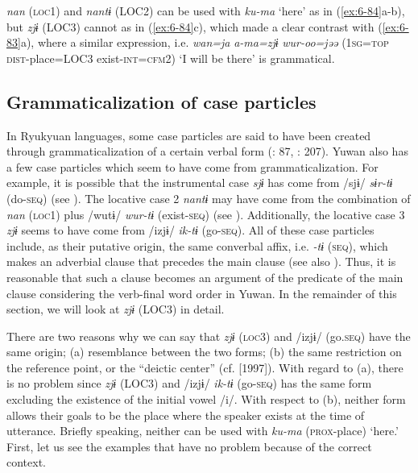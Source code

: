 \begin{table}
      [El: 130817]

\textit{nan} (\textsc{loc}1) and \textit{nantɨ} (LOC2) can be used with \textit{ku-ma} ‘here’ as in (\ref{ex:6-84}a-b), but \textit{zjɨ} (LOC3) cannot as in (\ref{ex:6-84}c), which made a clear contrast with (\ref{ex:6-83}a), where a similar expression, i.e. \textit{wan=ja} \textit{a-ma=zjɨ} \textit{wur-oo=jəə} (1\textsc{sg}=\textsc{top} \textsc{dist}-place=LOC3 exist-\textsc{int}=\textsc{cfm}2) ‘I will be there’ is grammatical.

\subsection{Grammaticalization of case particles}

In Ryukyuan languages, some case particles are said to have been created through grammaticalization of a certain verbal form (\citealt{NishiokaNakahara2000}: 87, \citealt{Shimoji2008}: 207). Yuwan also has a few case particles which seem to have come from grammaticalization. For example, it is possible that the instrumental case \textit{sjɨ} has come from /sjɨ/ \textit{sɨr-tɨ} (do-\textsc{seq}) (see ). The locative case 2 \textit{nantɨ} may have come from the combination of \textit{nan} (\textsc{loc}1) plus /wutɨ/ \textit{wur-tɨ} (exist-\textsc{seq}) (see ). Additionally, the locative case 3 \textit{zjɨ} seems to have come from /izjɨ/ \textit{ik-tɨ} (go-\textsc{seq}). All of these case particles include, as their putative origin, the same converbal affix, i.e. \textit{-tɨ} (\textsc{seq}), which makes an adverbial clause that precedes the main clause (see also ). Thus, it is reasonable that such a clause becomes an argument of the predicate of the main clause considering the verb-final word order in Yuwan. In the remainder of this section, we will look at \textit{zjɨ} (LOC3) in detail.

There are two reasons why we can say that \textit{zjɨ} (\textsc{loc}3) and /izjɨ/ (go.\textsc{seq}) have the same origin; (a) resemblance between the two forms; (b) the same restriction on the reference point, or the “deictic center” (cf. \citealt{Fillmore1971} [1997]). With regard to (a), there is no problem since \textit{zjɨ} (LOC3) and /izjɨ/ \textit{ik-tɨ} (go-\textsc{seq}) has the same form excluding the existence of the initial vowel /i/. With respect to (b), neither form allows their goals to be the place where the speaker exists at the time of utterance. Briefly speaking, neither can be used with \textit{ku-ma} (\textsc{prox}-place) ‘here.’ First, let us see the examples that have no problem because of the correct context.


\end{table}
